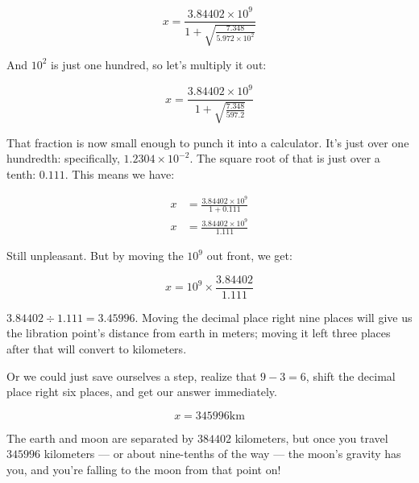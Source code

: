 \documentclass[10pt,twocolumn,letterpaper,preprint]{article}
\begin{document}
\[
x = \frac{3.84402 \times 10^9}{1 + \sqrt{\frac{7.348}{5.972 \times 10^{2}}}}
\]

And $10^2$ is just one hundred, so let's multiply it out:

\[
x = \frac{3.84402 \times 10^9}{1 + \sqrt{\frac{7.348}{597.2}}}
\]

That fraction is now small enough to punch it into a calculator.  It's just
over one hundredth: specifically, $1.2304 \times 10^{-2}$.  The square root
of that is just over a tenth: $0.111$.  This means we have:

\begin{align*}
x &= \frac{3.84402 \times 10^9}{1 + 0.111}\\
x &= \frac{3.84402 \times 10^9}{1.111}
\end{align*}

Still unpleasant.  But by moving the $10^9$ out front, we get:

\[
x = 10^9 \times \frac{3.84402}{1.111}
\]

$3.84402 \div 1.111 = 3.45996$.  Moving the decimal place right nine places
will give us the libration point's distance from earth in meters; moving it
left three places after that will convert to kilometers.

Or we could just save ourselves a step, realize that $9 - 3 = 6$, shift the
decimal place right six places, and get our answer immediately.

\[
x = 345996 \text{km}
\]

The earth and moon are separated by $384402$ kilometers, but once you travel
$345996$ kilometers --- or about nine-tenths of the way --- the moon's gravity
has you, and you're falling to the moon from that point on!
\end{document}
